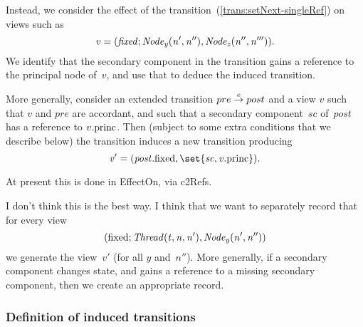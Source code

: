 Instead, we consider the effect of the 
transition~(\ref{trans:setNext-singleRef}) on views such as
\[\mit
v = (fixed; Node_y(n', n''), Node_z(n'', n''')).
\]
We identify that the secondary component in the  transition gains a
reference to the principal node of~$v$, and use that to deduce the induced
transition. 

More generally, consider an extended transition $pre \trans{e} post$ and a
view $v$ such that $v$ and $pre$ are accordant, and such that a secondary
component~$sc$ of~$post$ has a reference to $v.\princ$.  Then (subject to some
extra conditions that we describe below) the transition induces a new
transition producing
\[\mit
v' = (post.\fixed, \set{sc, v.\princ}).
\]

\begin{impNote}
At present this is done in EffectOn, via c2Refs. 
\end{impNote}

\begin{improve}
I don't think this is the
best way.  I think that we want to separately record that for every view
\[\mit 
(\fixed; Thread(t, n, n'), Node_y(n', n''))
\]
we generate the view~$v'$ (for all $y$ and~$n''$).  More generally, if a
secondary component changes state, and gains a reference to a missing
secondary component, then we create an appropriate record.
\end{improve}



\subsubsection{Definition of induced transitions}

